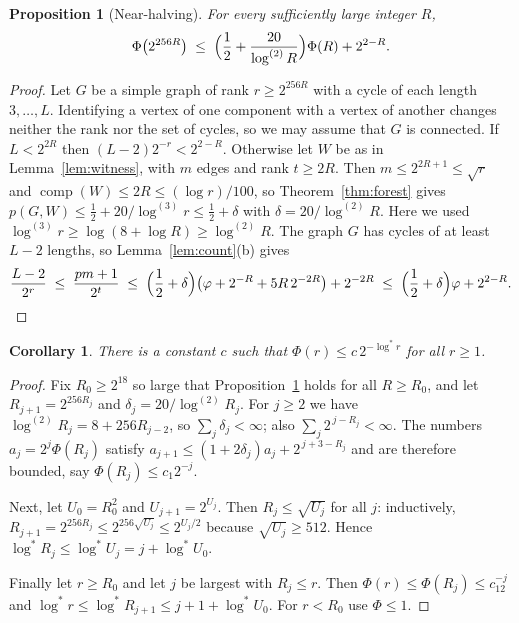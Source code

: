 \documentclass[11pt]{article}
\newtheorem{proposition}[theorem]{Proposition}
\newtheorem{corollary}[theorem]{Corollary}
\theoremstyle{definition}
\theoremstyle{remark}
\newcommand{\comp}{\operatorname{comp}}
\newcommand{\lgs}{\log^{*}}
\newcommand{\lgk}[1]{\log^{(#1)}}
\newcommand{\half}{\tfrac12}
\begin{document}
\begin{proposition}[Near-halving]\label{prop:halving}
For every sufficiently large integer $R$,
\[
  \Phi\bigl(2^{256R}\bigr)\;\le\;\Bigl(\frac12+\frac{20}{\lgk{2}R}\Bigr)\Phi(R)+2^{2-R}.
\]
\end{proposition}

\begin{proof}
Let $G$ be a simple graph of rank $r\ge2^{256R}$ with a cycle of each length $3,\dots,L$. Identifying
a vertex of one component with a vertex of another changes neither the rank nor the set of cycles, so
we may assume that $G$ is connected. If $L<2^{2R}$ then $(L-2)2^{-r}<2^{2-R}$. Otherwise let $W$ be
as in Lemma~\ref{lem:witness}, with $m$ edges and rank $t\ge2R$. Then $m\le2^{2R+1}\le\sqrt r$ and
$\comp(W)\le2R\le(\log r)/100$, so Theorem~\ref{thm:forest} gives
$p(G,W)\le\half+20/\lgk3 r\le\half+\delta$ with $\delta=20/\lgk2R$. Here we used
$\lgk3 r\ge\log(8+\log R)\ge\lgk2 R$. The graph $G$ has cycles of at least $L-2$ lengths, so
Lemma~\ref{lem:count}(b) gives
\[
  \frac{L-2}{2^{r}}\;\le\;\frac{pm+1}{2^{t}}
  \;\le\;\Bigl(\frac12+\delta\Bigr)\bigl(\varphi+2^{-R}+5R\,2^{-2R}\bigr)+2^{-2R}
  \;\le\;\Bigl(\frac12+\delta\Bigr)\varphi+2^{2-R}.\qedhere
\]
\end{proof}

\begin{corollary}\label{cor:phi}
There is a constant $c$ such that $\Phi(r)\le c\,2^{-\lgs r}$ for all $r\ge1$.
\end{corollary}

\begin{proof}
Fix $R_0\ge2^{18}$ so large that Proposition~\ref{prop:halving} holds for all $R\ge R_0$, and let
$R_{j+1}=2^{256R_j}$ and $\delta_j=20/\lgk2R_j$. For $j\ge2$ we have $\lgk2R_j=8+256R_{j-2}$, so
$\sum_j\delta_j<\infty$; also $\sum_j2^{\,j-R_j}<\infty$. The numbers $a_j=2^{j}\Phi(R_j)$ satisfy
$a_{j+1}\le(1+2\delta_j)a_j+2^{\,j+3-R_j}$ and are therefore bounded, say $\Phi(R_j)\le c_1 2^{-j}$.

Next, let $U_0=R_0^2$ and $U_{j+1}=2^{U_j}$. Then $R_j\le\sqrt{U_j}$ for all $j$: inductively,
$R_{j+1}=2^{256R_j}\le2^{256\sqrt{U_j}}\le2^{U_j/2}$ because $\sqrt{U_j}\ge512$. Hence
$\lgs R_j\le\lgs U_j=j+\lgs U_0$.

Finally let $r\ge R_0$ and let $j$ be largest with $R_j\le r$. Then
$\Phi(r)\le\Phi(R_j)\le c_12^{-j}$ and $\lgs r\le\lgs R_{j+1}\le j+1+\lgs U_0$. For $r<R_0$ use
$\Phi\le1$.
\end{proof}
\end{document}
